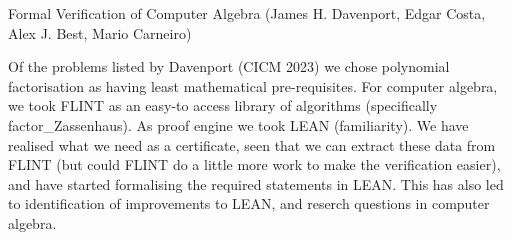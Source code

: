 Formal Verification of Computer Algebra
(James H. Davenport, Edgar Costa, Alex J. Best, Mario Carneiro)

Of the problems listed by Davenport (CICM 2023) we chose polynomial factorisation as having least mathematical pre-requisites.
For computer algebra, we took FLINT as an easy-to access library of algorithms (specifically factor_Zassenhaus).
As proof engine we took LEAN (familiarity).
We have realised what we need as a certificate, seen that we can extract these data from FLINT (but could FLINT do a little more work to make the
verification easier), and have started formalising the required statements in LEAN.
This has also led to identification of improvements to LEAN, and reserch questions in computer algebra.

